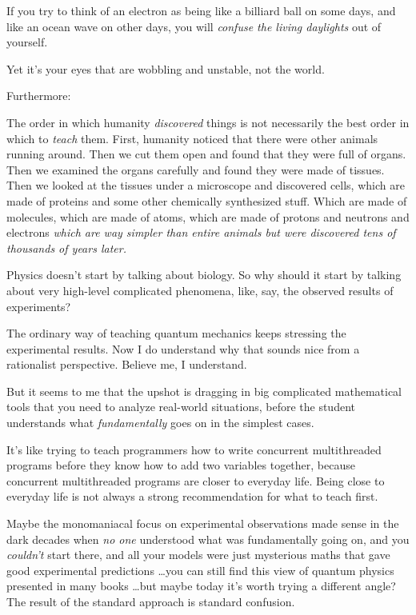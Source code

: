 {
 If you try to think of an electron as being like a billiard ball
on some days, and like an ocean wave on other days, you will
\textit{confuse the living daylights} out of yourself.}

{
 Yet it's your eyes that are wobbling and unstable,
not the world.}

{
 Furthermore:}

{
 The order in which humanity \textit{discovered} things is not
necessarily the best order in which to \textit{teach} them. First,
humanity noticed that there were other animals running around. Then we
cut them open and found that they were full of organs. Then we examined
the organs carefully and found they were made of tissues. Then we
looked at the tissues under a microscope and discovered cells, which
are made of proteins and some other chemically synthesized stuff. Which
are made of molecules, which are made of atoms, which are made of
protons and neutrons and electrons \textit{which are way simpler than
entire animals but were discovered tens of thousands of years later.}}

{
 Physics doesn't start by talking about biology. So
why should it start by talking about very high-level complicated
phenomena, like, say, the observed results of experiments?}

{
 The ordinary way of teaching quantum mechanics keeps stressing the
experimental results. Now I do understand why that sounds nice from a
rationalist perspective. Believe me, I understand.}

{
 But it seems to me that the upshot is dragging in big complicated
mathematical tools that you need to analyze real-world situations,
before the student understands what \textit{fundamentally} goes on in
the simplest cases.}

{
 It's like trying to teach programmers how to write
concurrent multithreaded programs before they know how to add two
variables together, because concurrent multithreaded programs are
closer to everyday life. Being close to everyday life is not always a
strong recommendation for what to teach first.}

{
 Maybe the monomaniacal focus on experimental observations made
sense in the dark decades when \textit{no one} understood what was
fundamentally going on, and you \textit{couldn't} start
there, and all your models were just mysterious maths that gave good
experimental predictions \ldots you can still find this view of quantum
physics presented in many books \ldots but maybe today
it's worth trying a different angle? The result of the
standard approach is standard confusion.}

